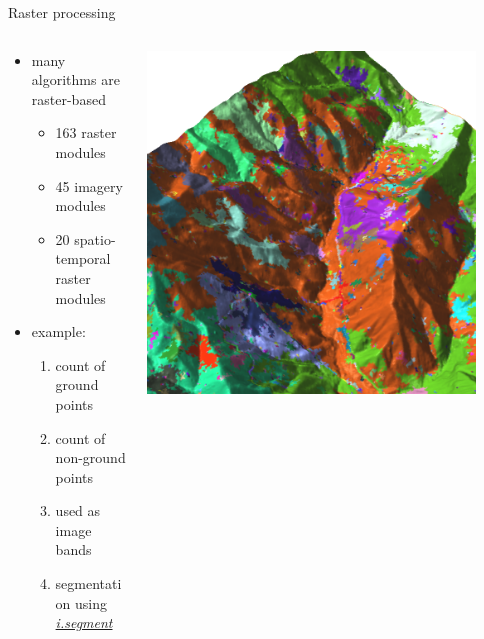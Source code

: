 \documentclass[xcolor={dvipsnames,usenames},beamer,aspectratio=43]{beamer}
\newcommand{\gmodule}[1]{\href{http://grass.osgeo.org/grass71/manuals/#1.html}{\emph{#1}}}
\begin{document}
\begin{frame}{Raster processing}




\begin{columns}
\begin{column}{0.5\textwidth}

\begin{itemize}
  \item many algorithms are raster-based
  \begin{itemize}
    \item 163 raster modules
    \item 45 imagery modules
    \item 20 spatio-temporal raster modules
  \end{itemize}
  \item example:
  \begin{enumerate}
    \item count of ground points
    \item count of non-ground points
    \item used as image bands
    \item segmentation using \gmodule{i.segment}
  \end{enumerate}
\end{itemize}

\end{column}
\begin{column}{0.45\textwidth}

\begin{center}
  \includegraphics[width=0.9\textwidth]{grass/segment_on_counts}
\end{center}


\end{column}
\end{columns}
\end{frame}
\end{document}
